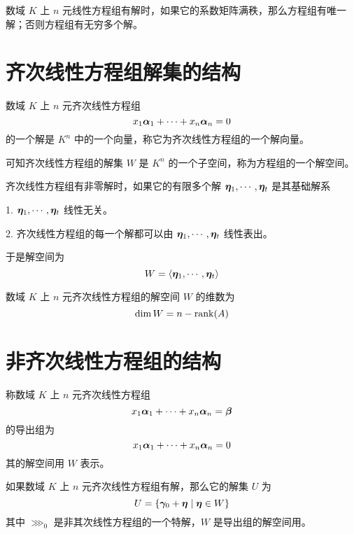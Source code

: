 \begin{theorem}
	数域 $K$ 上 $n$ 元线性方程组有解时，如果它的系数矩阵满秩，那么方程组有唯一解；否则方程组有无穷多个解。
\end{theorem}

\section{齐次线性方程组解集的结构}

数域 $K$ 上 $n$ 元齐次线性方程组
$$x_1\boldsymbol{\alpha}_1 + \cdots + x_n\boldsymbol{\alpha}_n = 0$$
的一个解是 $K^n$ 中的一个向量，称它为齐次线性方程组的一个解向量。

可知齐次线性方程组的解集 $W$ 是 $K^n$ 的一个子空间，称为方程组的一个解空间。

\begin{definition}
	齐次线性方程组有非零解时，如果它的有限多个解 $\boldsymbol{\eta}_1,\cdots,\boldsymbol{\eta}_t$ 是其基础解系

	1. $\boldsymbol{\eta}_1,\cdots,\boldsymbol{\eta}_t$ 线性无关。

	2. 齐次线性方程组的每一个解都可以由 $\boldsymbol{\eta}_1,\cdots,\boldsymbol{\eta}_t$ 线性表出。
\end{definition}

于是解空间为
$$W = \langle \boldsymbol{\eta}_1,\cdots,\boldsymbol{\eta}_t \rangle$$

\begin{theorem}
	数域 $K$ 上 $n$ 元齐次线性方程组的解空间 $W$ 的维数为
	$$\dim W = n-\operatorname{rank}(A)$$
\end{theorem}

\section{非齐次线性方程组的结构}

称数域 $K$ 上 $n$ 元齐次线性方程组
$$x_1\boldsymbol{\alpha}_1 + \cdots + x_n\boldsymbol{\alpha}_n = \boldsymbol{\beta}$$
的导出组为
$$x_1\boldsymbol{\alpha}_1 + \cdots + x_n\boldsymbol{\alpha}_n = 0$$
其的解空间用 $W$ 表示。

\begin{theorem}
	如果数域 $K$ 上 $n$ 元齐次线性方程组有解，那么它的解集 $U$ 为
	$$U = \{\boldsymbol{\gamma}_0+\boldsymbol{\eta} \mid \boldsymbol{\eta} \in W\}$$
	其中 $\ggg_0$ 是非其次线性方程组的一个特解，$W$ 是导出组的解空间用。
\end{theorem}









